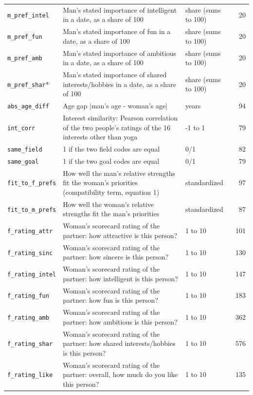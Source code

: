\documentclass[11pt]{article}
\begin{document}
\begin{longtable}{L{3.3cm}L{8.2cm}L{2.4cm}r}
\texttt{m\_pref\_intel} & Man's stated importance of intelligent in a date, as a share of 100 & share (sums to 100) & 20 \\
\texttt{m\_pref\_fun} & Man's stated importance of fun in a date, as a share of 100 & share (sums to 100) & 20 \\
\texttt{m\_pref\_amb} & Man's stated importance of ambitious in a date, as a share of 100 & share (sums to 100) & 20 \\
\texttt{m\_pref\_shar}* & Man's stated importance of shared interests/hobbies in a date, as a share of 100 & share (sums to 100) & 20 \\
\texttt{abs\_age\_diff} & Age gap |man's age - woman's age| & years & 94 \\
\texttt{int\_corr} & Interest similarity: Pearson correlation of the two people's ratings of the 16 interests other than yoga & -1 to 1 & 79 \\
\texttt{same\_field} & 1 if the two field codes are equal & 0/1 & 82 \\
\texttt{same\_goal} & 1 if the two goal codes are equal & 0/1 & 79 \\
\texttt{fit\_to\_f\_prefs} & How well the man's relative strengths fit the woman's priorities (compatibility term, equation 1) & standardized & 97 \\
\texttt{fit\_to\_m\_prefs} & How well the woman's relative strengths fit the man's priorities & standardized & 87 \\
\texttt{f\_rating\_attr} & Woman's scorecard rating of the partner: how attractive is this person? & 1 to 10 & 101 \\
\texttt{f\_rating\_sinc} & Woman's scorecard rating of the partner: how sincere is this person? & 1 to 10 & 130 \\
\texttt{f\_rating\_intel} & Woman's scorecard rating of the partner: how intelligent is this person? & 1 to 10 & 147 \\
\texttt{f\_rating\_fun} & Woman's scorecard rating of the partner: how fun is this person? & 1 to 10 & 183 \\
\texttt{f\_rating\_amb} & Woman's scorecard rating of the partner: how ambitious is this person? & 1 to 10 & 362 \\
\texttt{f\_rating\_shar} & Woman's scorecard rating of the partner: how shared interests/hobbies is this person? & 1 to 10 & 576 \\
\texttt{f\_rating\_like} & Woman's scorecard rating of the partner: overall, how much do you like this person? & 1 to 10 & 135 \\

\end{longtable}
\end{document}
